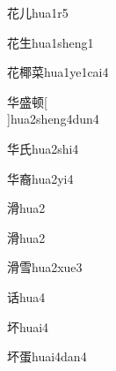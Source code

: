 \begin{verbete}[7;2]{花儿}{hua1r5}
\end{verbete}

\begin{verbete}[7;5]{花生}{hua1sheng1}
\end{verbete}

\begin{verbete}[7;12;11]{花椰菜}{hua1ye1cai4}
\end{verbete}

\begin{verbete*}[6;11;10]{华盛顿}[\\]{hua2sheng4dun4}
\end{verbete*}

\begin{verbete}[6;4]{华氏}{hua2shi4}
\end{verbete}

\begin{verbete}[6;13]{华裔}{hua2yi4}
\end{verbete}

\begin{verbete}[12]{滑}{hua2}
\end{verbete}
\begin{verbete*}[12]{滑}{hua2}
\end{verbete*}

\begin{verbete}[12;11]{滑雪}{hua2xue3}
\end{verbete}

\begin{verbete}[8]{话}{hua4}
\end{verbete}

\begin{verbete}[7]{坏}{huai4}
\end{verbete}

\begin{verbete}[7;11]{坏蛋}{huai4dan4}
\end{verbete}

